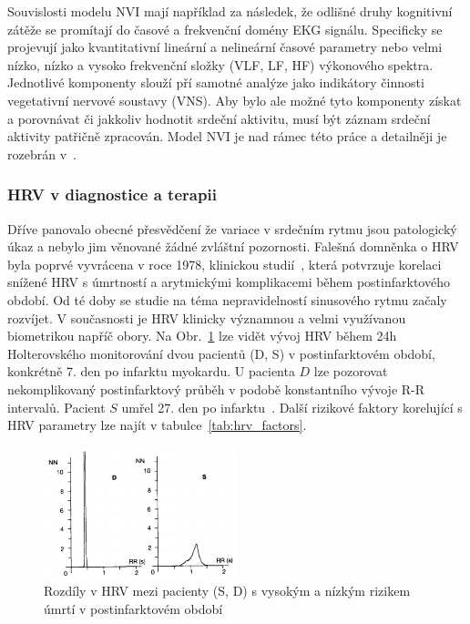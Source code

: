 Souvislosti modelu NVI mají například za následek, že odlišné druhy kognitivní
zátěže se promítají do časové a frekvenční domény EKG signálu. Specificky se
projevují jako kvantitativní lineární a nelineární časové parametry nebo velmi
nízko, nízko a vysoko frekvenční složky (VLF, LF, HF) výkonového spektra.
Jednotlivé komponenty slouží pří samotné analýze jako indikátory činnosti
vegetativní nervové soustavy (VNS). Aby bylo ale možné tyto komponenty získat a
porovnávat či jakkoliv hodnotit srdeční aktivitu, musí být záznam srdeční
aktivity patřičně zpracován. Model NVI je nad rámec této práce a detailněji je
rozebrán v~\cite{Smith2017}.

\subsubsection{HRV v diagnostice a terapii}
Dříve panovalo obecné přesvědčení že variace v srdečním rytmu jsou patologický
úkaz a nebylo jim věnované žádné zvláštní pozornosti. Falešná domněnka o HRV
byla poprvé vyvrácena v roce 1978, klinickou studií~\cite{Wolf1978}, která
potvrzuje korelaci snížené HRV s úmrtností a arytmickými komplikacemi během
postinfarktového období. Od té doby se studie na téma nepravidelností sinusového
rytmu začaly rozvíjet. V současnosti je HRV klinicky významnou a
velmi využívanou biometrikou napříč obory. Na Obr.~\ref{fig:hrv_infarct} lze
vidět vývoj HRV během 24h Holterovského monitorování dvou pacientů (D, S) v
postinfarktovém období, konkrétně 7. den po infarktu myokardu. U pacienta $D$
lze pozorovat nekomplikovaný postinfarktový průběh v podobě konstantního vývoje
R-R intervalů. Pacient $S$ umřel 27. den po infarktu~\cite{Malik1990}. Další
rizikové faktory korelující s HRV parametry lze najít v
tabulce~\ref{tab:hrv_factors}.

\begin{figure}[h]
	\begin{center}
		\includegraphics[width=0.5\textwidth]{../assets/figures/hrv_infarct}
		\caption{Rozdíly v HRV mezi pacienty (S, D) s vysokým a nízkým rizikem úmrtí v
			postinfarktovém období \cite{Malik1990}}
		\label{fig:hrv_infarct}
	\end{center}
\end{figure}

